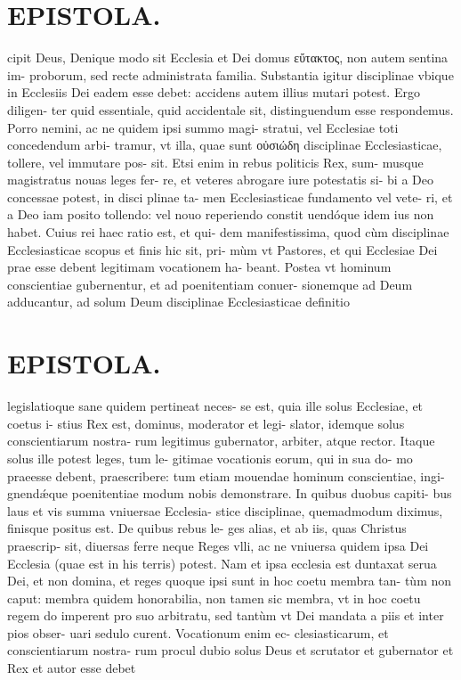 \documentclass{article}
\begin{document}
\begin{pages}
\section*{EPISTOLA. }\pstart cipit Deus, Denique modo sit Ecclesia et Dei domus εὔτακτος, non autem sentina im- proborum, sed recte administrata familia. Substantia igitur disciplinae vbique in Ecclesiis Dei eadem esse debet: accidens autem illius mutari potest. Ergo diligen- ter quid essentiale, quid accidentale sit, distinguendum esse respondemus. Porro nemini, ac ne quidem ipsi summo magi- stratui, vel Ecclesiae toti concedendum arbi- tramur, vt illa, quae sunt οὐσιώδη disciplinae Ecclesiasticae, tollere, vel immutare pos- sit. Etsi enim in rebus politicis Rex, sum- musque magistratus nouas leges fer- re, et veteres abrogare iure potestatis si- bi a Deo concessae potest, in disci plinae ta- men Ecclesiasticae fundamento vel vete- ri, et a Deo iam posito tollendo: vel nouo reperiendo constit uendóque idem ius non habet. Cuius rei haec ratio est, et qui- dem manifestissima, quod cùm disciplinae Ecclesiasticae scopus et finis hic sit, pri- mùm vt Pastores, et qui Ecclesiae Dei prae esse debent legitimam vocationem ha- beant. Postea vt hominum conscientiae gubernentur, et ad poenitentiam conuer- sionemque ad Deum adducantur, ad solum Deum disciplinae Ecclesiasticae definitio  \pend
\section*{EPISTOLA. }\pstart legislatioque sane quidem pertineat neces- se est, quia ille solus Ecclesiae, et coetus i- stius Rex est, dominus, moderator et legi- slator, idemque solus conscientiarum nostra- rum legitimus gubernator, arbiter, atque rector. Itaque solus ille potest leges, tum le- gitimae vocationis eorum, qui in sua do- mo praeesse debent, praescribere: tum etiam mouendae hominum conscientiae, ingi- gnendǽque poenitentiae modum nobis demonstrare. In quibus duobus capiti- bus laus et vis summa vniuersae Ecclesia- stice disciplinae, quemadmodum diximus, finisque positus est. De quibus rebus le- ges alias, et ab iis, quas Christus praescrip- sit, diuersas ferre neque Reges vlli, ac ne vniuersa quidem ipsa Dei Ecclesia (quae est in his terris) potest. Nam et ipsa ecclesia est duntaxat serua Dei, et non domina, et reges quoque ipsi sunt in hoc coetu membra tan- tùm non caput: membra quidem honorabilia, non tamen sic membra, vt in hoc coetu regem do imperent pro suo arbitratu, sed tantùm vt Dei mandata a piis et inter pios obser- uari sedulo curent. Vocationum enim ec- clesiasticarum, et conscientiarum nostra- rum procul dubio solus Deus et scrutator et gubernator et Rex et autor esse debet  \pend

\end{pages}
\end{document}
